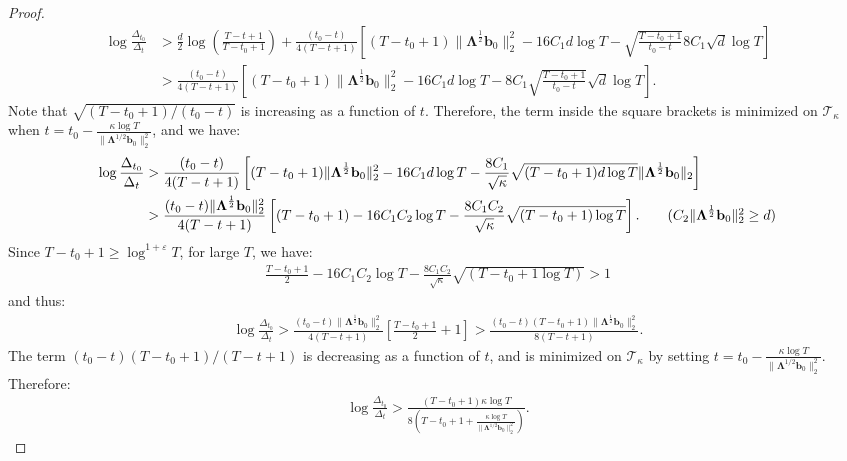 \begin{proof}
\begin{align*}
    \log \frac{\Delta_{t_0}}{\Delta_t} &> \frac{d}{2}\log\left(\frac{T-t+1}{T-t_0+1}\right) + \frac{(t_0 - t) }{4(T-t+1)}\left[(T-t_0+1)\lVert\boldsymbol{\Lambda}^{\frac{1}{2}} \mathbf{b}_0\rVert^2_2 -16C_1d\log T - \sqrt{\frac{T-t_0+1}{t_0-t}}8C_1\sqrt{d}\log T\right] \\
    &> \frac{(t_0 - t) }{4(T-t+1)}\left[(T-t_0+1)\lVert\boldsymbol{\Lambda}^{\frac{1}{2}} \mathbf{b}_0\rVert^2_2 -16C_1d\log T - 8C_1\sqrt{\frac{T-t_0+1}{t_0-t}}\sqrt{d}\log T\right]. \tag{$T-t+1 > T - t_0+1$}
\end{align*}
Note that $\sqrt{(T-t_0+1)/(t_0-t)}$ is increasing as a function of $t$. Therefore, the term inside the square brackets is minimized on $\mathcal{T}_\kappa$ when $t = t_0 - \frac{\kappa\log T}{\lVert\boldsymbol{\Lambda}^{1/2}\mathbf{b}_0\rVert_2^2}$, and we have:
\begin{align*}
    \log \frac{\Delta_{t_0}}{\Delta_t} &> \frac{(t_0 - t) }{4(T-t+1)}\left[(T-t_0+1)\lVert\boldsymbol{\Lambda}^{\frac{1}{2}} \mathbf{b}_0\rVert^2_2 -16C_1d\log T - \frac{8C_1}{\sqrt{\kappa}}\sqrt{(T-t_0+1)d\log T}\lVert\boldsymbol{\Lambda}^{\frac{1}{2}} \mathbf{b}_0\rVert_2\right] \\
    &> \frac{(t_0 - t) \lVert\boldsymbol{\Lambda}^{\frac{1}{2}} \mathbf{b}_0\rVert^2_2}{4(T-t+1)}\left[(T-t_0+1) -16C_1C_2\log T - \frac{8C_1C_2 }{\sqrt{\kappa}}\sqrt{(T-t_0+1)\log T}\right]. \tag{$C_2 \lVert\boldsymbol{\Lambda}^{\frac{1}{2}}\mathbf{b}_0\rVert_2^2 \geq d$}
\end{align*}
Since $T-t_0+1\geq \log^{1+\varepsilon} T$, for large $T$, we have: 
\begin{align*}
    \frac{T-t_0+1}{2} -16C_1C_2 \log T - \frac{8C_1C_2 }{\sqrt{\kappa}}\sqrt{(T-t_0+1\log T)} > 1
\end{align*}
and thus:
\begin{align*}
    \log \frac{\Delta_{t_0}}{\Delta_t} > \frac{(t_0 - t) \lVert\boldsymbol{\Lambda}^{\frac{1}{2}} \mathbf{b}_0\rVert^2_2}{4(T-t+1)} \left[\frac{T-t_0+1}{2} + 1 \right ] >\frac{(t_0 - t)(T-t_0+1) \lVert\boldsymbol{\Lambda}^{\frac{1}{2}} \mathbf{b}_0\rVert^2_2}{8(T-t+1)}.
\end{align*}
The term $(t_0 - t)(T-t_0+1) / (T-t+1)$ is decreasing as a function of $t$, and is minimized on $\mathcal{T}_\kappa$ by setting  $t = t_0 - \frac{\kappa\log T}{\lVert\boldsymbol{\Lambda}^{1/2}\mathbf{b}_0\rVert_2^2}$. Therefore:
\begin{align*}
    \log \frac{\Delta_{t_0}}{\Delta_t} > \frac{(T-t_0+1) \kappa\log T}{8\left(T-t_0+1 + \frac{\kappa\log T}{\lVert\boldsymbol{\Lambda}^{1/2}\mathbf{b}_0\rVert_2^2} \right)}.

\end{align*}
\end{proof}
